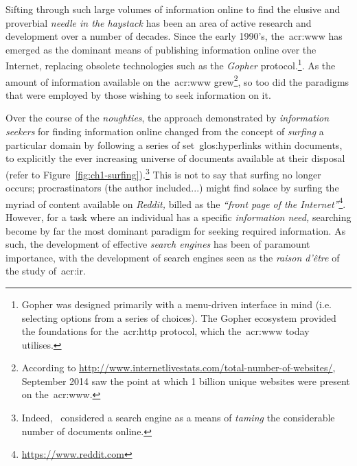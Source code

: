 Sifting through such large volumes of information online to find the elusive and proverbial \emph{needle in the haystack} has been an area of active research and development over a number of decades. Since the early 1990's, the~\gls{acr:www} has emerged as the dominant means of publishing information online over the Internet, replacing obsolete technologies such as the \emph{Gopher} protocol.\footnote{Gopher was designed primarily with a menu-driven interface in mind (i.e. selecting options from a series of choices). The Gopher ecosystem provided the foundations for the~\gls{acr:http} protocol, which the~\gls{acr:www} today utilises.}. As the amount of information available on the~\gls{acr:www} grew\footnote{According to \url{http://www.internetlivestats.com/total-number-of-websites/}, September 2014 saw the point at which 1 billion unique websites were present on the~\gls{acr:www}.}, so too did the paradigms that were employed by those wishing to seek information on it.

Over the course of the \emph{noughties}, the approach demonstrated by \emph{information seekers} for finding information online changed from the concept of \emph{surfing} a particular domain by following a series of set~\glspl{glos:hyperlink} within documents, to explicitly  the ever increasing universe of documents available at their disposal (refer to Figure~\ref{fig:ch1-surfing}).\footnote{Indeed,~\cite{mcbryan1994taming_tools} considered a search engine as a means of \emph{taming} the considerable number of documents online.} This is not to say that surfing no longer occurs; procrastinators (the author included...) might find solace by surfing the myriad of content available on \emph{Reddit,} billed as the \emph{``front page of the Internet''}\footnote{\url{https://www.reddit.com}}. However, for a task where an individual has a specific \emph{information need,} searching become by far the most dominant paradigm for seeking required information. As such, the development of effective \emph{search engines} has been of paramount importance, with the development of search engines seen as the \emph{raison d'\^{e}tre} of the study of~\gls{acr:ir}.

